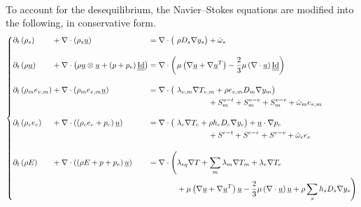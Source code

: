       \paragraph{}
      To account for the desequilibrium, the Navier--Stokes equations are modified into the following, in conservative form.
      \begin{equation}
        \left\{\begin{alignedat}{7}
          &\partial_t\left(  \rho_s  \right) &&+ \nabla\cdot\left(  \rho_s \underline{u}  \right) &&=
            \nabla\cdot\bigl( && \rho D_s \nabla y_s\bigr) + \dot \omega_s \\[10pt]
          &\partial_t\left(  \rho \underline{u}  \right) &&+ \nabla\cdot\left(  \rho \underline{u} \otimes \underline{u}  +  \left(p + p_e\right) \underline{\underline{\operatorname{Id}}}  \right) &&=
            \nabla\cdot\biggl( &&
              \mu \left(\nabla \underline{u} + \nabla \underline{u}^T\right)
              - \frac{2}{3} \mu \left(\nabla \cdot \underline{u} \right) \underline{\underline{\operatorname{Id}}}
            \biggr) \\[10pt]
          &\partial_t\left(  \rho_m e_{v,m}  \right) &&+ \nabla\cdot\left(  \rho_m e_{v,m} \underline{u}  \right) &&=
            \nabla\cdot\bigl( &&
              \lambda_{v,m} \nabla T_{v,m}
              + \rho e_{v,m} D_m \nabla y_m
            \bigr) \\
            &&&&&&& \qquad\qquad + S^{v-t}_m + S^{v-v}_m + S^{v-e}_m + \dot \omega_m e_{v,m} \\[10pt]
          &\partial_t\left(  \rho_e e_e  \right) &&+ \nabla\cdot\left(  \left(\rho_e e_e + p_e\right) \underline{u}  \right) &&=
            \nabla\cdot\bigl( &&
              \lambda_e \nabla T_e
              + \rho h_e D_e \nabla y_e
            \bigr)
            + \underline{u} \cdot \nabla p_e \\
            &&&&&&& \qquad\qquad + S^{e-t} + S^{e-r} + S^{e-v} + \dot \omega_e e_e \\[10pt]
          &\partial_t\left(  \rho E  \right) &&+ \nabla\cdot\left(  \left(\rho E + p + p_e\right) \underline{u}  \right) &&=
            \nabla\cdot\Biggl(
              &&\lambda_{eq} \nabla T
              + \sum_m \lambda_m \nabla T_m
              + \lambda_e \nabla T_e \\
              &&&&&&& + \mu \left(\nabla \underline{u} + \nabla \underline{u}^T\right) \underline{u} - \frac{2}{3} \mu \left(\nabla \cdot \underline{u}\right) \underline{u}
              + \rho \sum_s h_s D_s \nabla y_s
            \Biggr)
        \end{alignedat}\right.
      \end{equation}










